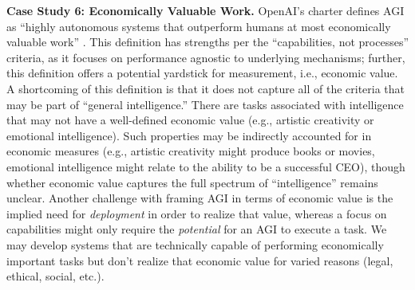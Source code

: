 \documentclass{article}
\theoremstyle{plain}
\theoremstyle{definition}
\theoremstyle{remark}
\begin{document}
\textbf{Case Study 6: Economically Valuable Work.} OpenAI's charter defines AGI as “highly autonomous systems that outperform humans at most economically valuable work” \citep{openAICharter}. This definition has strengths per the “capabilities, not processes” criteria, as it focuses on performance agnostic to underlying mechanisms; further, this definition offers a potential yardstick for measurement, i.e., economic value. A shortcoming of this definition is that it does not capture all of the criteria that may be part of “general intelligence.” There are tasks associated with intelligence that may not have a well-defined economic value (e.g., artistic creativity or emotional intelligence). Such properties may be indirectly accounted for in economic measures (e.g., artistic creativity might produce books or movies, emotional intelligence might relate to the ability to be a successful CEO), though whether economic value captures the full spectrum of “intelligence” remains unclear. Another challenge with framing AGI in terms of economic value is the implied need for \textit{deployment} in order to realize that value, whereas a focus on capabilities might only require the \textit{potential} for an AGI to execute a task. We may develop systems that are technically capable of performing economically important tasks but don't realize that economic value for varied reasons (legal, ethical, social, etc.).
\end{document}

